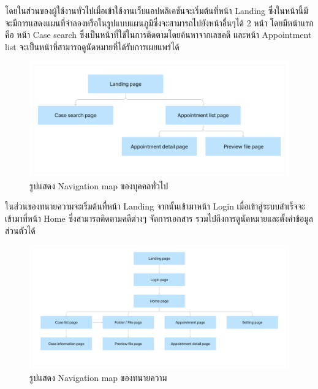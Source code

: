\documentclass[12pt,oneside,openright,a4paper]{cpe-thai-project}
\begin{document}
\hspace{1cm}โดยในส่วนของผู้ใช้งานทั่วไปเมื่อเข้าใช้งานเว็บแอปพลิเคชันจะเริ่มต้นที่หน้า Landing ซึ่งในหน้านี้มีจะมีการแสดงแผนที่จำลองหรือในรูปแบบแผนภูมิซึ่งจะสามารถไปยังหน้าอื่นๆได้ 2 หน้า โดยมีหน้าแรกคือ 
หน้า Case search ซึ่งเป็นหน้าที่ใช้ในการติดตามโดยค้นหาจากเลขคดี และหน้า Appointment list จะเป็นหน้าที่สามารถดูนัดหมายที่ได้รับการเผยแพร่ได้  \\
\begin{figure}[!ht]\centering
    \includegraphics[width=13cm]{./assets/nav-map-guest.png}
    \caption{รูปแสดง Navigation map ของบุคคลทั่วไป}\label{fig:navMapGuest}

\end{figure}

\hspace{1cm}ในส่วนของทนายความจะเริ่มต้นที่หน้า Landing จากนั้นเข้ามาหน้า Login เมื่อเข้าสู่ระบบสำเร็จจะเข้ามาที่หน้า Home ซึ่งสามารถติดตามคดีต่างๆ จัดการเอกสาร รวมไปถึงการดูนัดหมายและตั้งค่าข้อมูลส่วนตัวได้ \\
\begin{figure}[!ht]\centering
    \includegraphics[width=13cm]{./assets/nav-map-lawyer.png}
    \caption{รูปแสดง Navigation map ของทนายความ}\label{fig:navMapLawyer}
\end{figure}

\clearpage
\newpage
\end{document}
